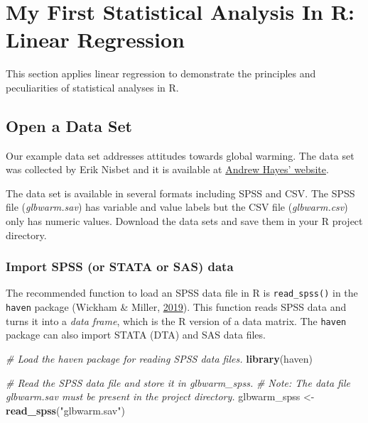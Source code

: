\documentclass[doc,floatsintext]{apa6}
\newenvironment{Shaded}{\begin{snugshade}}{\end{snugshade}}
\newcommand{\KeywordTok}[1]{\textcolor[rgb]{0.13,0.29,0.53}{\textbf{#1}}}
\newcommand{\StringTok}[1]{\textcolor[rgb]{0.31,0.60,0.02}{#1}}
\newcommand{\CommentTok}[1]{\textcolor[rgb]{0.56,0.35,0.01}{\textit{#1}}}
\newcommand{\NormalTok}[1]{#1}
\begin{document}
\section{My First Statistical Analysis In R: Linear
Regression}\label{firstanalysis}

This section applies linear regression to demonstrate the principles and
peculiarities of statistical analyses in R.

\subsection{Open a Data Set}\label{open-a-data-set}

Our example data set addresses attitudes towards global warming. The
data set was collected by Erik Nisbet and it is available at
\href{http://afhayes.com/introduction-to-mediation-moderation-and-conditional-process-analysis.html}{Andrew
Hayes' website}.

The data set is available in several formats including SPSS and CSV. The
SPSS file (\emph{glbwarm.sav}) has variable and value labels but the CSV
file (\emph{glbwarm.csv}) only has numeric values. Download the data
sets and save them in your R project directory.

\subsubsection{Import SPSS (or STATA or SAS)
data}\label{import-spss-or-stata-or-sas-data}

The recommended function to load an SPSS data file in R is
\texttt{read\_spss()} in the \texttt{haven} package (Wickham \& Miller,
\protect\hyperlink{ref-R-haven}{2019}). This function reads SPSS data
and turns it into a \emph{data frame}, which is the R version of a data
matrix. The \texttt{haven} package can also import STATA (DTA) and SAS
data files.

\begin{Shaded}
\begin{Highlighting}[]
\CommentTok{# Load the haven package for reading SPSS data files.}
\KeywordTok{library}\NormalTok{(haven)}

\CommentTok{# Read the SPSS data file and store it in glbwarm_spss.}
\CommentTok{# Note: The data file glbwarm.sav must be present in the project directory.}
\NormalTok{glbwarm_spss <-}\StringTok{ }\KeywordTok{read_spss}\NormalTok{(}\StringTok{"glbwarm.sav"}\NormalTok{)}
\end{Highlighting}
\end{Shaded}
\end{document}
